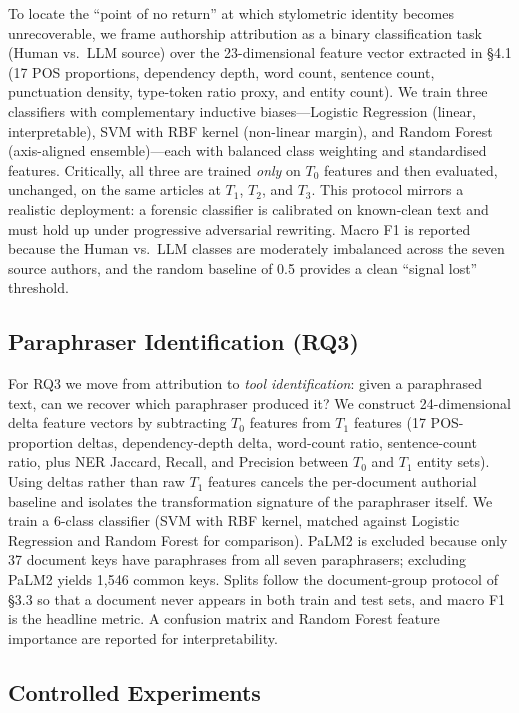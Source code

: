 To locate the ``point of no return'' at which stylometric identity becomes unrecoverable, we frame authorship attribution as a binary classification task (Human vs.\ LLM source) over the 23-dimensional feature vector extracted in \S4.1 (17 POS proportions, dependency depth, word count, sentence count, punctuation density, type-token ratio proxy, and entity count). We train three classifiers with complementary inductive biases---Logistic Regression (linear, interpretable), SVM with RBF kernel (non-linear margin), and Random Forest (axis-aligned ensemble)---each with balanced class weighting and standardised features. Critically, all three are trained \emph{only} on $T_0$ features and then evaluated, unchanged, on the same articles at $T_1$, $T_2$, and $T_3$. This protocol mirrors a realistic deployment: a forensic classifier is calibrated on known-clean text and must hold up under progressive adversarial rewriting. Macro F1 is reported because the Human vs.\ LLM classes are moderately imbalanced across the seven source authors, and the random baseline of 0.5 provides a clean ``signal lost'' threshold.

\subsection{Paraphraser Identification (RQ3)}

For RQ3 we move from attribution to \emph{tool identification}: given a paraphrased text, can we recover which paraphraser produced it? We construct 24-dimensional delta feature vectors by subtracting $T_0$ features from $T_1$ features (17 POS-proportion deltas, dependency-depth delta, word-count ratio, sentence-count ratio, plus NER Jaccard, Recall, and Precision between $T_0$ and $T_1$ entity sets). Using deltas rather than raw $T_1$ features cancels the per-document authorial baseline and isolates the transformation signature of the paraphraser itself. We train a 6-class classifier (SVM with RBF kernel, matched against Logistic Regression and Random Forest for comparison). PaLM2 is excluded because only 37 document keys have paraphrases from all seven paraphrasers; excluding PaLM2 yields 1,546 common keys. Splits follow the document-group protocol of \S3.3 so that a document never appears in both train and test sets, and macro F1 is the headline metric. A confusion matrix and Random Forest feature importance are reported for interpretability.

\subsection{Controlled Experiments}

